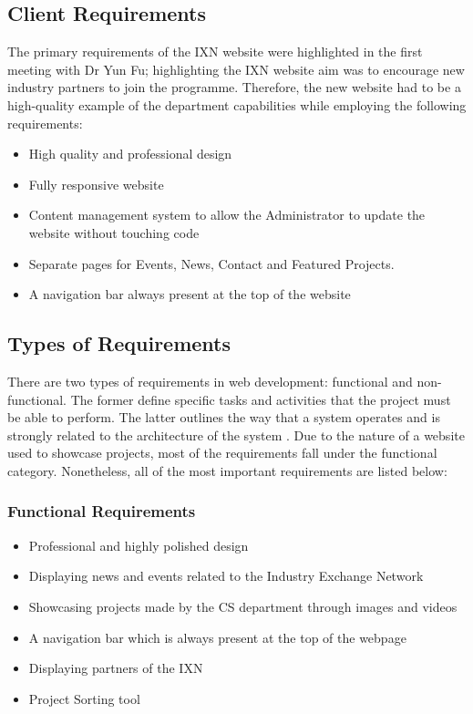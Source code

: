 \documentclass[fontsize=11pt]{extarticle}
\numberwithin{figure}{section} %
\numberwithin{table}{section}%
\providecommand{\tightlist}{%
  \setlength{\itemsep}{0pt}\setlength{\parskip}{0pt}}
\begin{document}
\hypertarget{client-requirements}{%
\subsection{Client Requirements}\label{client-requirements}}

The primary requirements of the IXN website were highlighted in the
first meeting with Dr Yun Fu; highlighting the IXN website aim was to
encourage new industry partners to join the programme. Therefore, the
new website had to be a high-quality example of the department
capabilities while employing the following requirements:

\begin{itemize}
\tightlist
\item
  High quality and professional design
\item
  Fully responsive website
\item
  Content management system to allow the Administrator to update the
  website without touching code
\item
  Separate pages for Events, News, Contact and Featured Projects.
\item
  A navigation bar always present at the top of the website
\end{itemize}

\hypertarget{types-of-requirements}{%
\subsection{Types of Requirements}\label{types-of-requirements}}

There are two types of requirements in web development: functional and
non-functional. The former define specific tasks and activities that the
project must be able to perform. The latter outlines the way that a
system operates and is strongly related to the architecture of the
system \cite{g5}. Due to the nature of a website used to showcase
projects, most of the requirements fall under the functional category.
Nonetheless, all of the most important requirements are listed below:

\hypertarget{functional-requirements}{%
\subsubsection{Functional Requirements}\label{functional-requirements}}

\begin{itemize}
\tightlist
\item
  Professional and highly polished design
\item
  Displaying news and events related to the Industry Exchange Network
\item
  Showcasing projects made by the CS department through images and
  videos
\item
  A navigation bar which is always present at the top of the webpage
\item
  Displaying partners of the IXN
\item
  Project Sorting tool
\end{itemize}
\end{document}
